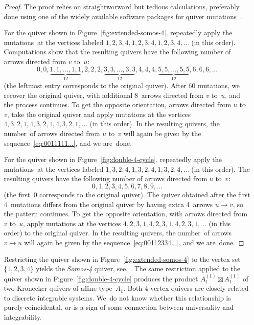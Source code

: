 \begin{proof}
The proof relies on straightworward but tedious calculations, preferably done using one of the widely available software packages for quiver mutations~\cite{keller-applet, musiker-stump}. 

For the quiver shown in Figure~\ref{fig:extended-somos-4}, repeatedly apply the mutations~at the vertices labeled $1,2,3,4,1,2,3,4,1,2,3,4,\dots$
(in this order). Computations show that the resulting quivers have the following number of arrows directed from $v$ to~$u$:
\begin{equation}
\label{eq:0011111...}
0, 0, \underbrace{1,1,\dots,1,1}_{12},2,2,2,\underbrace{3,3,\dots,3,3}_{12},4,4,4,\underbrace{5,5,\dots,5,5}_{12},6,6,6,\dots
\end{equation}
(the leftmost entry corresponds to the original quiver). 
After 60 mutations, we recover the original quiver, with additional 8~arrows directed from $v$ to~$u$, and the process continues. To get the opposite orientation, \ie arrows directed from $u$ to~$v$, take the original quiver and apply mutations at the vertices $4,3,2,1,4,3,2,1,4,3,2,1,\dots$ (in this order). 
In the resulting quivers, the number~of arrows directed from $u$ to~$v$ will again be given by the sequence~\eqref{eq:0011111...}, and we are~done. 

For the quiver shown in Figure~\ref{fig:double-4-cycle}, repeatedly apply the mutations~at the vertices labeled $1,3,2,4,1,3,2,4,1,3,2,4,\dots$ (in this order). The resulting quivers have the following number of arrows directed from $u$ to~$v$:
\begin{equation}
\label{eq:00112334...}
0,1,2,3,4,5,6,7,8,9,\dots
\end{equation}
(the first~0 corresponds to the original quiver). 
The quiver obtained after the first 4~mutations differs from the original quiver by having extra 4~arrows $u\!\longrightarrow \!v$, so the pattern continues. To get the opposite orientation, with arrows directed from $v$ to~$u$, apply mutations at the vertices $4,2,3,1,4,2,3,1,4,2,3,1,\dots$ (in this order) to the original quiver. 
In the resulting quivers, the number~of arrows $v\!\longrightarrow \!u$ will again be given by the sequence~\eqref{eq:00112334...}, and we are~done. 
\end{proof}


\begin{remark}
Restricting the quiver shown in Figure~\ref{fig:extended-somos-4} to the vertex set $\{1,2,3,4\}$ yields the \emph{Somos-4} quiver, see, \eg \cite[Section~7.1]{marsh-lectures}. 
The same restriction applied to the quiver shown in Figure~\ref{fig:double-4-cycle} produces the product $A_1^{(1)}\boxtimes A_1^{(1)}$ of two Kronecker quivers of affine type~$A_1$. Both $4$-vertex quivers are closely related to discrete integrable systems. We~do not know whether this relationship is purely coincidental, or is a sign of some connection between universality and integrability. 
\end{remark}


